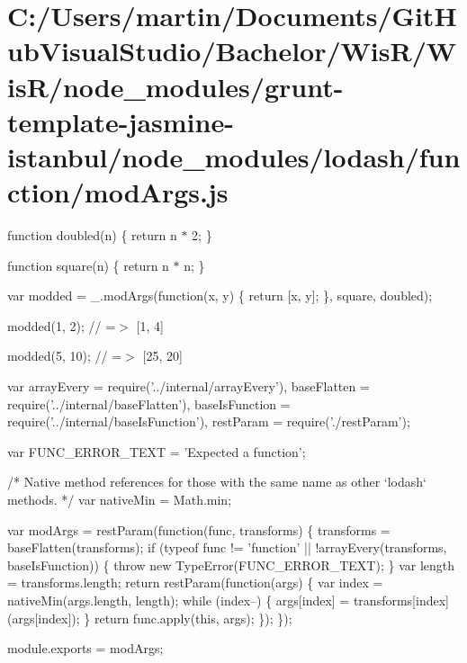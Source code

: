 \hypertarget{_c_1_2_users_2martin_2_documents_2_git_hub_visual_studio_2_bachelor_2_wis_r_2_wis_r_2node_module3fd4f1e6fd99e856b62d085b199b1173}{}\section{C\+:/\+Users/martin/\+Documents/\+Git\+Hub\+Visual\+Studio/\+Bachelor/\+Wis\+R/\+Wis\+R/node\+\_\+modules/grunt-\/template-\/jasmine-\/istanbul/node\+\_\+modules/lodash/function/mod\+Args.\+js}
function doubled(n) \{ return n $\ast$ 2; \}

function square(n) \{ return n $\ast$ n; \}

var modded = \+\_\+.\+mod\+Args(function(x, y) \{ return \mbox{[}x, y\mbox{]}; \}, square, doubled);

modded(1, 2); // =$>$ \mbox{[}1, 4\mbox{]}

modded(5, 10); // =$>$ \mbox{[}25, 20\mbox{]}


\begin{DoxyCodeInclude}
var arrayEvery = require(\textcolor{stringliteral}{'../internal/arrayEvery'}),
    baseFlatten = require(\textcolor{stringliteral}{'../internal/baseFlatten'}),
    baseIsFunction = require(\textcolor{stringliteral}{'../internal/baseIsFunction'}),
    restParam = require(\textcolor{stringliteral}{'./restParam'});

var FUNC\_ERROR\_TEXT = \textcolor{stringliteral}{'Expected a function'};

\textcolor{comment}{/* Native method references for those with the same name as other `lodash` methods. */}
var nativeMin = Math.min;

var modArgs = restParam(\textcolor{keyword}{function}(func, transforms) \{
  transforms = baseFlatten(transforms);
  \textcolor{keywordflow}{if} (typeof func != \textcolor{stringliteral}{'function'} || !arrayEvery(transforms, baseIsFunction)) \{
    \textcolor{keywordflow}{throw} \textcolor{keyword}{new} TypeError(FUNC\_ERROR\_TEXT);
  \}
  var length = transforms.length;
  \textcolor{keywordflow}{return} restParam(\textcolor{keyword}{function}(args) \{
    var index = nativeMin(args.length, length);
    \textcolor{keywordflow}{while} (index--) \{
      args[index] = transforms[index](args[index]);
    \}
    \textcolor{keywordflow}{return} func.apply(\textcolor{keyword}{this}, args);
  \});
\});

module.exports = modArgs;
\end{DoxyCodeInclude}
 
